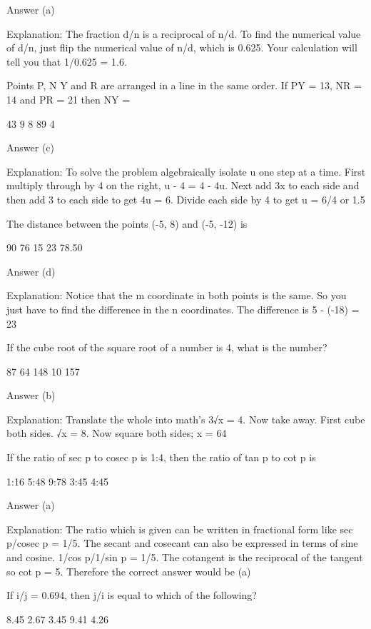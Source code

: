     Answer (a)

    Explanation: The fraction d/n is a reciprocal of n/d. To find the numerical value of d/n, just flip the numerical value of n/d, which is 0.625. Your calculation will tell you that 1/0.625 = 1.6.

    Points P, N Y and R are arranged in a line in the same order. If PY = 13, NR = 14 and PR = 21 then NY =

        43
        9
        8
        89
        4 

    Answer (c)

    Explanation: To solve the problem algebraically isolate u one step at a time. First multiply through by 4 on the right, u - 4 = 4 - 4u. Next add 3x to each side and then add 3 to each side to get 4u = 6. Divide each side by 4 to get u = 6/4 or 1.5

    The distance between the points (-5, 8) and (-5, -12) is

        90
        76
        15
        23
        78.50 

    Answer (d)

    Explanation: Notice that the m coordinate in both points is the same. So you just have to find the difference in the n coordinates. The difference is 5 - (-18) = 23

    If the cube root of the square root of a number is 4, what is the number?

        87
        64
        148
        10
        157 

    Answer (b)

    Explanation: Translate the whole into math's 3√x = 4. Now take away. First cube both sides. √x = 8. Now square both sides; x = 64

    If the ratio of sec p to cosec p is 1:4, then the ratio of tan p to cot p is

        1:16
        5:48
        9:78
        3:45
        4:45 

    Answer (a)

    Explanation: The ratio which is given can be written in fractional form like sec p/cosec p = 1/5. The secant and cosecant can also be expressed in terms of sine and cosine. 1/cos p/1/sin p = 1/5. The cotangent is the reciprocal of the tangent so cot p = 5. Therefore the correct answer would be (a)

    If i/j = 0.694, then j/i is equal to which of the following?

        8.45
        2.67
        3.45
        9.41
        4.26 

